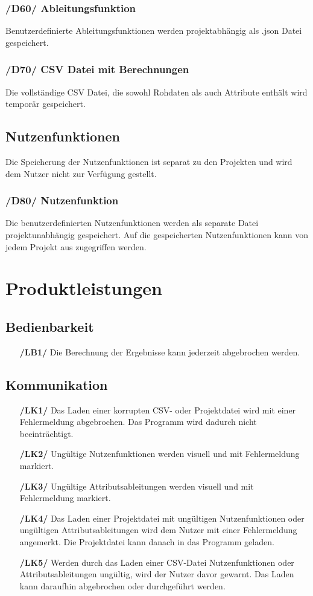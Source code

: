 \documentclass{article}
\begin{document}
\subsubsection*{/D60/ Ableitungsfunktion}
Benutzerdefinierte Ableitungsfunktionen werden projektabhängig als .json Datei gespeichert.
\subsubsection*{/D70/ CSV Datei mit Berechnungen}
Die vollständige CSV Datei, die sowohl Rohdaten als auch Attribute enthält wird temporär gespeichert.
\subsection{Nutzenfunktionen}
Die Speicherung der Nutzenfunktionen ist separat zu den Projekten und wird dem Nutzer nicht zur Verfügung gestellt.
\subsubsection*{/D80/ Nutzenfunktion}
Die benutzerdefinierten Nutzenfunktionen werden als separate Datei projektunabhängig gespeichert. Auf die gespeicherten Nutzenfunktionen kann von jedem Projekt aus zugegriffen werden.


\clearpage
\section{Produktleistungen}
\subsection{Bedienbarkeit}
\begin{itemize}
    \item[\textbf{/LB1/}] Die Berechnung der Ergebnisse kann jederzeit abgebrochen werden.
\end{itemize}
\subsection{Kommunikation}
\begin{itemize}
    \item[\textbf{/LK1/}] Das Laden einer korrupten CSV- oder Projektdatei wird mit einer Fehlermeldung abgebrochen. Das Programm wird dadurch nicht beeinträchtigt.
    \item[\textbf{/LK2/}] Ungültige Nutzenfunktionen werden visuell und mit Fehlermeldung markiert.
    \item[\textbf{/LK3/}] Ungültige Attributsableitungen werden visuell und mit Fehlermeldung markiert.
    \item[\textbf{/LK4/}] Das Laden einer Projektdatei mit ungültigen Nutzenfunktionen oder ungültigen Attributsableitungen wird dem Nutzer mit einer Fehlermeldung angemerkt. Die Projektdatei kann danach in das Programm geladen.
    \item[\textbf{/LK5/}] Werden durch das Laden einer CSV-Datei Nutzenfunktionen oder Attributsableitungen ungültig, wird der Nutzer davor gewarnt. Das Laden kann daraufhin abgebrochen oder durchgeführt werden.
\end{itemize}
\end{document}
